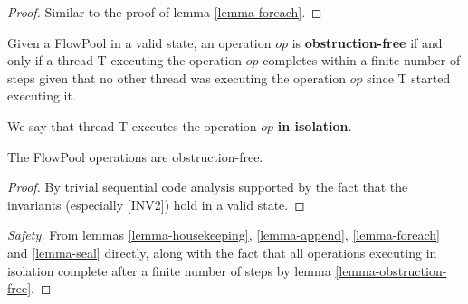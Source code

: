 \documentclass[runningheads,a4paper]{llncs}
\begin{document}
\begin{proof}
Similar to the proof of lemma \ref{lemma-foreach}.
\end{proof}


\begin{definition}
Given a FlowPool in a valid state, an operation $op$ is
\textbf{obstruction-free} if and only if a thread T executing the
operation $op$ completes within a finite number of steps given that
no other thread was executing the operation $op$ since T started executing it.

We say that thread T executes the operation $op$ \textbf{in isolation}.
\end{definition}


\begin{lemma}\label{lemma-obstruction-free}
The FlowPool operations are obstruction-free.
\end{lemma}

\begin{proof}
By trivial sequential code analysis supported by the fact that the
invariants (especially [INV2]) hold in a valid state.
\end{proof}

\begin{proof}[Safety]
From lemmas \ref{lemma-housekeeping}, \ref{lemma-append}, \ref{lemma-foreach} and
\ref{lemma-seal} directly, along with the fact that all operations
executing in  isolation complete after a finite number of steps by lemma \ref{lemma-obstruction-free}.
\end{proof}



\end{document}
